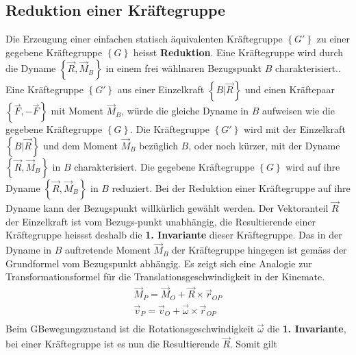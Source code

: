 \subsection{Reduktion einer Kräftegruppe}
Die Erzeugung einer einfachen statisch äquivalenten Kräftegruppe $\left\{G'\right\}$ zu einer gegebene Kräftegruppe $\left\{G\right\}$ heisst \textbf{Reduktion}. Eine Kräftegruppe wird durch die Dyname $\left\{\overrightarrow{R}, \overrightarrow{M}_B\right\}$ in einem frei wählnaren Bezugspunkt $B$ charakterisiert.. Eine Kräftegruppe $\left\{G'\right\}$ aus einer Einzelkraft $\left\{B | \overrightarrow{R}\right\}$ und einen Kräftepaar $\left\{\overrightarrow{F}, -\overrightarrow{F}\right\}$ mit Moment $\overrightarrow{M}_B$, würde die gleiche Dyname in $B$ aufweisen wie die gegebene Kräftegruppe $\left\{G\right\}$. Die Kräftegruppe $\left\{G'\right\}$ wird mit der Einzelkraft $\left\{B | \overrightarrow{R}\right\}$ und dem Moment $\overrightarrow{M}_B$ bezüglich $B$, oder noch kürzer, mit der Dyname $\left\{\overrightarrow{R}, \overrightarrow{M}_B\right\}$ in $B$ charakterisiert. Die gegebene Kräftegruppe $\left\{G\right\}$ wird auf ihre Dyname $\left\{\overrightarrow{R}, \overrightarrow{M}_B\right\}$ in $B$ reduziert.
\newline\newline
Bei der Reduktion einer Kräftegruppe auf ihre Dyname kann der Bezugspunkt willkürlich gewählt werden. Der Vektoranteil $\overrightarrow{R}$ der Einzelkraft ist vom Bezugs-punkt unabhängig, die Resultierende einer Kräftegruppe heissst deshalb die \textbf{1. Invariante} dieser Kräftegruppe.
\newline\newline
Das in der Dyname in $B$ auftretende Moment $\overrightarrow{M}_B$ der Kräftegruppe hingegen ist gemäss der Grundformel vom Bezugspunkt abhängig. Es zeigt sich eine Analogie zur Transformationsformel für die Translationsgeschwindigkeit in der Kinemate.
\begin{equation}
\boxed{\begin{array}{lll}
\overrightarrow{M}_P=\overrightarrow{M}_O+\overrightarrow{R}\times \overrightarrow{r}_{OP}\\
\overrightarrow{v}_P=\overrightarrow{v}_O+\overrightarrow{\omega}\times \overrightarrow{r}_{OP}\\
\end{array}}
\end{equation}
Beim GBewegungszustand ist die Rotationsgeschwindigkeit $\overrightarrow{\omega}$ die \textbf{1. Invariante}, bei einer Kräftegruppe ist es nun die Resultierende $\overrightarrow{R}$. Somit gilt
